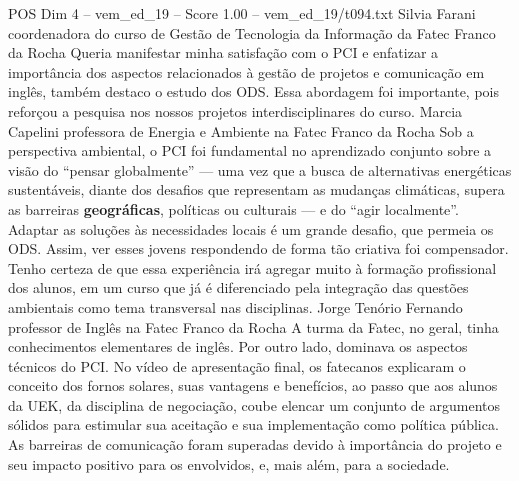 \begin{textsample}{POS Dim 4 – vem\_ed\_19 – Score 1.00 – vem\_ed\_19/t094.txt}  \label{ex:f4_pos_113}
Silvia Farani coordenadora do curso de Gestão de Tecnologia da Informação da Fatec Franco da Rocha Queria manifestar minha satisfação com o PCI e enfatizar a importância dos aspectos relacionados à gestão de projetos e comunicação em inglês, também destaco o estudo dos ODS.
Essa abordagem foi importante, pois reforçou a pesquisa nos nossos projetos interdisciplinares do curso.
Marcia Capelini professora de Energia e Ambiente na Fatec Franco da Rocha Sob a perspectiva ambiental, o PCI foi fundamental no aprendizado conjunto sobre a visão do “pensar globalmente” — uma vez que a busca de alternativas energéticas sustentáveis, diante dos desafios que representam as mudanças climáticas, supera as barreiras \textbf{geográficas}, políticas ou culturais — e do “agir localmente”.
Adaptar as soluções às necessidades locais é um grande desafio, que permeia os ODS.
Assim, ver esses jovens respondendo de forma tão criativa foi compensador.
Tenho certeza de que essa experiência irá agregar muito à formação profissional dos alunos, em um curso que já é diferenciado pela integração das questões ambientais como tema transversal nas disciplinas.
Jorge Tenório Fernando professor de Inglês na Fatec Franco da Rocha A turma da Fatec, no geral, tinha conhecimentos elementares de inglês.
Por outro lado, dominava os aspectos técnicos do PCI.
No vídeo de apresentação final, os fatecanos explicaram o conceito dos fornos solares, suas vantagens e benefícios, ao passo que aos alunos da UEK, da disciplina de negociação, coube elencar um conjunto de argumentos sólidos para estimular sua aceitação e sua implementação como política pública.
As barreiras de comunicação foram superadas devido à importância do projeto e seu impacto positivo para os envolvidos, e, mais além, para a sociedade.

\end{textsample}
